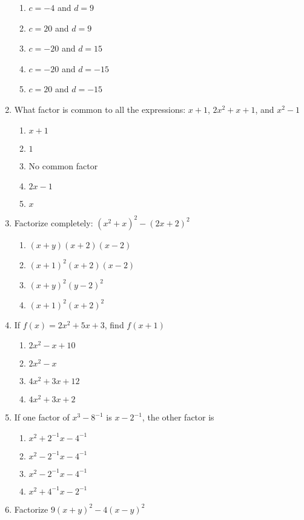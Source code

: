 \begin{multicols}{2}
\begin{enumerate}[label={\arabic*.}]
	\begin{enumerate}[label={\Alph*.}]
	\item \(c=-4\) and \(d=9\)
	\item \(c=20\) and \(d =9\)
	\item \(c=-20\) and \(d=15\)
	\item \(c=-20\) and \(d=-15\)
	\item \(c=20\) and \(d=-15\)
	\end{enumerate}
\item What factor is common to all the expressions: \(x+1\), \(2{x}^{2}+x+1\), and \({x}^{2}-1\)
	\begin{enumerate}[label={\Alph*.}]
	\item \(x+1\)
	\item \(1\)
	\item No common factor
	\item \(2x-1\)
	\item \(x\)
	\end{enumerate}
\item Factorize completely: \(({x}^{2}+x)^2-(2x+2)^2\)
	\begin{enumerate}[label={\Alph*.}]
	\item \((x+y)(x+2)(x-2)\)
	\item \((x+1)^2(x+2)(x-2)\)
	\item \((x+y)^2(y-2)^2\)
	\item \((x+1)^2(x+2)^2\)
	\end{enumerate}
\item If \(f(x) = 2{x}^{2}+5x+3\), find \(f(x+1)\)
	\begin{enumerate}[label={\Alph*.}]
	\item \(2{x}^{2}-x+10\)
	\item \(2{x}^{2}-x\)
	\item \(4{x}^{2}+3x+12\)
	\item \(4{x}^{2}+3x+2\)
	\end{enumerate}
\item If one factor of \({x}^{3}-8^{-1}\) is \(x-2^{-1}\), the other factor is
	\begin{enumerate}[label={\Alph*.}]
	\item \({x}^{2}+2^{-1}x-4^{-1}\)
	\item \({x}^{2}-2^{-1}x-4^{-1}\)
	\item \({x}^{2}-2^{-1}x-4^{-1}\)
	\item \({x}^{2}+4^{-1}x-2^{-1}\)
	\end{enumerate}
\item Factorize \(9(x+y)^2 - 4(x-y)^2\)

\end{enumerate}
\end{multicols}
